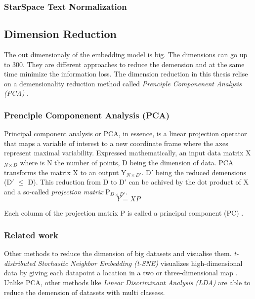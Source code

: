 \subsubsection{StarSpace Text Normalization}
\label{subsubsec:star-space-text-normalization}

\subsection{Dimension Reduction}
\label{subsec:dimension-reduction}
The out dimensionaly of the embedding model is big. The dimensions can go up to 300. They are different approaches to reduce the demension and at the same time minimize the information loss. The dimension reduction in this thesis relise on a demensionality reduction method called \emph{Prenciple Componenent Analysis (PCA)} \cite{wold1987principal}.

\subsubsection{Prenciple Componenent Analysis (PCA)}
\label{subsubsec:pca}
Principal component analysis or PCA, in essence, is a linear projection operator that maps a variable of interest to a new coordinate frame where the axes represent maximal variability. Expressed mathematically, an input data matrix X$_{N \times D}$ where is N the number of points, D being the dimension of data. PCA transforms the matrix X to an output Y$_{N \times D\prime}$. D$\prime$ being the reduced demensions (D$\prime$ $\leq$ D). This reduction from D to D$\prime$ can be achived by the dot product of X and a so-called \emph{projection matrix} P$_{D \times D\prime}$.
	\begin{equation}
		\label{PCA}
		Y = XP
	\end{equation}

Each column of the projection matrix P is called a principal component (PC) \cite{projectionMatrix}. 


\subsubsection{Related work}
\label{subsubsec:dimension-reduction-related-work}
Other methods to reduce the dimension of big datasets and visualise them. \emph{t-distributed Stochastic Neighbor Embedding (t-SNE)} visualizes high-dimensional data by giving each datapoint a location in a two or three-dimensional map \cite{van2008visualizing}. Unlike PCA, other methods like \emph{Linear Discriminant Analysis (LDA)} \cite{balakrishnama1998linear} are able to reduce the demension of datasets with multi classess.

